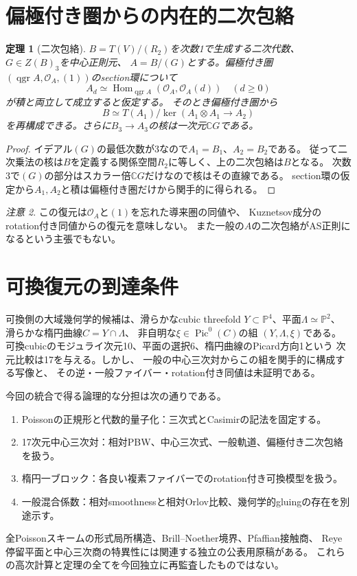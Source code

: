 \documentclass[a4paper,11pt]{ltjsarticle}
\newcommand{\CC}{\mathbb C}
\newcommand{\PP}{\mathbb P}
\newcommand{\OO}{\mathcal O}
\newcommand{\qgr}{\operatorname{qgr}}
\newtheorem{theorem}{定理}[section]
\theoremstyle{remark}
\newtheorem{remark}[theorem]{注意}
\begin{document}
\section{偏極付き圏からの内在的二次包絡}
\begin{theorem}[二次包絡]\label{thm:envelope}
$B=T(V)/(R_2)$を次数1で生成する二次代数、$G\in Z(B)_3$を中心正則元、
$A=B/(G)$とする。偏極付き圏
$(\qgr A,\OO_A,(1))$のsection環について
\[
A_d\simeq\operatorname{Hom}_{\qgr A}(\OO_A,\OO_A(d))\quad(d\ge0)
\]
が積と両立して成立すると仮定する。
そのとき偏極付き圏から
\[
B\simeq T(A_1)/\ker(A_1\otimes A_1\longrightarrow A_2)
\]
を再構成できる。さらに$B_3\to A_3$の核は一次元$\CC G$である。
\end{theorem}
\begin{proof}
イデアル$(G)$の最低次数が3なので$A_1=B_1$、$A_2=B_2$である。
従って二次乗法の核は$B$を定義する関係空間$R_2$に等しく、上の二次包絡は$B$となる。
次数3で$(G)$の部分はスカラー倍$\CC G$だけなので核はその直線である。
section環の仮定から$A_1,A_2$と積は偏極付き圏だけから関手的に得られる。
\end{proof}
\begin{remark}
この復元は$\OO_A$と$(1)$を忘れた導来圏の同値や、
Kuznetsov成分のrotation付き同値からの復元を意味しない。
また一般の$A$の二次包絡がAS正則になるという主張でもない。
\end{remark}

\section{可換復元の到達条件}
可換側の大域幾何学的候補は、滑らかなcubic threefold
$Y\subset\PP^4$、平面$\Lambda\simeq\PP^2$、
滑らかな楕円曲線$C=Y\cap\Lambda$、
非自明な$\xi\in\operatorname{Pic}^0(C)$の組 $(Y,\Lambda,\xi)$である。
可換cubicのモジュライ次元10、平面の選択6、楕円曲線のPicard方向1という
次元比較は17を与える。しかし、
一般の中心三次対からこの組を関手的に構成する写像と、
その逆・一般ファイバー・rotation付き同値は未証明である。

今回の統合で得る論理的な分担は次の通りである。
\begin{enumerate}[label=(\roman*)]
\item Poissonの正規形と代数的量子化：三次式とCasimirの記法を固定する。
\item 17次元中心三次対：相対PBW、中心三次式、一般軌道、偏極付き二次包絡を扱う。
\item 楕円一ブロック：各良い複素ファイバーでのrotation付き可換模型を扱う。
\item 一般混合係数：相対smoothnessと相対Orlov比較、幾何学的gluingの存在を別途示す。
\end{enumerate}
全Poissonスキームの形式局所構造、Brill--Noether境界、Pfaffian接触商、
Reye停留平面と中心三次商の特異性には関連する独立の公表用原稿がある。
これらの高次計算と定理の全てを今回独立に再監査したものではない。
\end{document}
